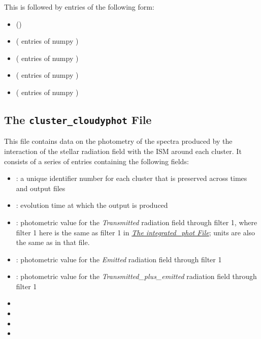 \documentclass[letterpaper,10pt,english]{sphinxmanual}
\begin{document}
This is followed by  entries of the following form:
\begin{itemize}
\item {} 
 ()

\item {} 
 ( entries of numpy )

\item {} 
 ( entries of numpy )

\item {} 
 ( entries of numpy )

\item {} 
 ( entries of numpy
)

\end{itemize}


\subsection{The \texttt{cluster\_cloudyphot} File}
\label{cloudy:the-cluster-cloudyphot-file}
This file contains data on the photometry of the spectra produced by
the interaction of the stellar radiation field with the ISM around
each cluster. It consists of a series of entries containing the
following fields:
\begin{itemize}
\item {} 
: a unique identifier number for each cluster that is
preserved across times and output files

\item {} 
: evolution time at which the output is produced

\item {} 
: photometric value for the \emph{Transmitted}
radiation field through filter 1, where filter 1 here is the same as
filter 1 in {\hyperref[output:ssec\string-int\string-phot\string-file]{\emph{The integrated\_phot File}}}; units are also the same as
in that file.

\item {} 
: photometric value for the \emph{Emitted}
radiation field through filter 1

\item {} 
: photometric value for the
\emph{Transmitted\_plus\_emitted} radiation field through filter 1

\item {} 

\item {} 

\item {} 

\item {} 

\end{itemize}
\end{document}
